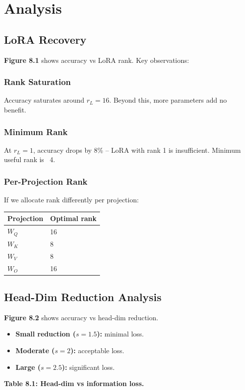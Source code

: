 
\section{Analysis}

\subsection{LoRA Recovery}

\textbf{Figure 8.1} shows accuracy vs LoRA rank. Key observations:

\subsubsection{Rank Saturation}

Accuracy saturates around $r_L = 16$. Beyond this, more 
parameters add no benefit.

\subsubsection{Minimum Rank}

At $r_L = 1$, accuracy drops by 8\% -- LoRA with rank 1 is 
insufficient. Minimum useful rank is ~4.

\subsubsection{Per-Projection Rank}

If we allocate rank differently per projection:

\begin{table}[H]
\centering
\small
\begin{tabular}{ll}
\toprule
\textbf{Projection} & \textbf{Optimal rank} \\
\midrule
$W_Q$ & 16 \\
$W_K$ & 8 \\
$W_V$ & 8 \\
$W_O$ & 16 \\
\bottomrule
\end{tabular}
\end{table}

\subsection{Head-Dim Reduction Analysis}

\textbf{Figure 8.2} shows accuracy vs head-dim reduction.

\begin{itemize}
\item \textbf{Small reduction ($s=1.5$):} minimal loss.
\item \textbf{Moderate ($s=2$):} acceptable loss.
\item \textbf{Large ($s=2.5$):} significant loss.

\end{itemize}
\textbf{Table 8.1: Head-dim vs information loss.}

